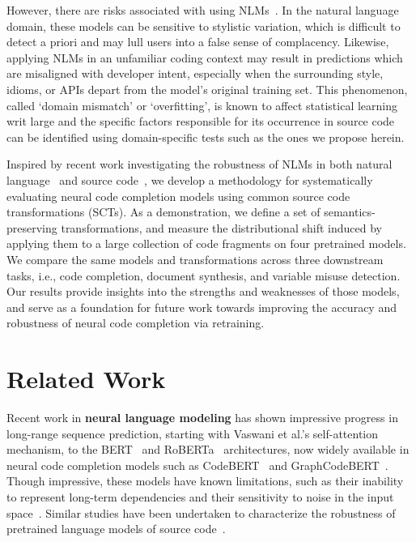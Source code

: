 \documentclass[usenames,dvipsnames]{article} %
\begin{document}
  However, there are risks associated with using NLMs~\citep{hellendoorn2017deep}. In the natural language domain, these models can be sensitive to stylistic variation, which is difficult to detect a priori and may lull users into a false sense of complacency. Likewise, applying NLMs in an unfamiliar coding context may result in predictions which are misaligned with developer intent, especially when the surrounding style, idioms, or APIs depart from the model's original training set. This phenomenon, called `domain mismatch' or `overfitting', is known to affect statistical learning writ large and the specific factors responsible for its occurrence in source code can be identified using domain-specific tests such as the ones we propose herein.

  Inspired by recent work investigating the robustness of NLMs in both natural language~\citep{wang2020cat} and source code~\citep{ramakrishnan2020semantic}, we develop a methodology for systematically evaluating neural code completion models using common source code transformations (SCTs). As a demonstration, we define a set of semantics-preserving transformations, and measure the distributional shift induced by applying them to a large collection of code fragments on four pretrained models. We compare the same models and transformations across three downstream tasks, i.e., code completion, document synthesis, and variable misuse detection. Our results provide insights into the strengths and weaknesses of those models, and serve as a foundation for future work towards improving the accuracy and robustness of neural code completion via retraining.

  \section{Related Work}\label{sec:related_work}

  Recent work in \textbf{neural language modeling} has shown impressive progress in long-range sequence prediction, starting with Vaswani et al.'s self-attention~\citep{vaswani2017attention} mechanism, to the BERT~\citep{devlin2018bert} and RoBERTa~\citep{liu2019roberta} architectures, now widely available in neural code completion models such as CodeBERT~\citep{feng2020codebert} and GraphCodeBERT~\citep{guo2021graphcodebert}. Though impressive, these models have known limitations, such as their inability to represent long-term dependencies and their sensitivity to noise in the input space~\cite{sun2020adv}. Similar studies have been undertaken to characterize the robustness of pretrained language models of source code~\citep{hellendoorn2017deep}.
\end{document}

